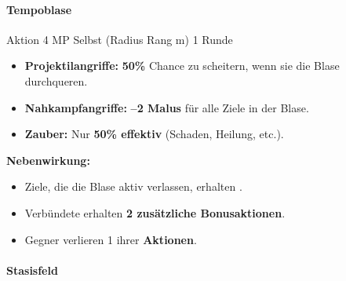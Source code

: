\paragraph*{Tempoblase}

\spellcard
{}
{Aktion}
{4 MP}
{Selbst (Radius Rang m)}
{1 Runde}
{
	\begin{itemize}
		\item \textbf{Projektilangriffe:} \textbf{50\%} Chance zu scheitern, wenn sie die Blase durchqueren.
		\item \textbf{Nahkampfangriffe:} \textbf{–2 Malus} für alle Ziele in der Blase.
		\item \textbf{Zauber:} Nur \textbf{50\% effektiv} (Schaden, Heilung, etc.).
	\end{itemize}
	
	\medskip
	\textbf{Nebenwirkung:}
	\begin{itemize}
		\item Ziele, die die Blase aktiv verlassen, erhalten .
	\end{itemize}
}
{
	\begin{itemize}
		\item Verbündete erhalten \textbf{2 zusätzliche Bonusaktionen}.
		\item Gegner verlieren 1 ihrer \textbf{Aktionen}.
	\end{itemize}
}

\paragraph*{Stasisfeld}

